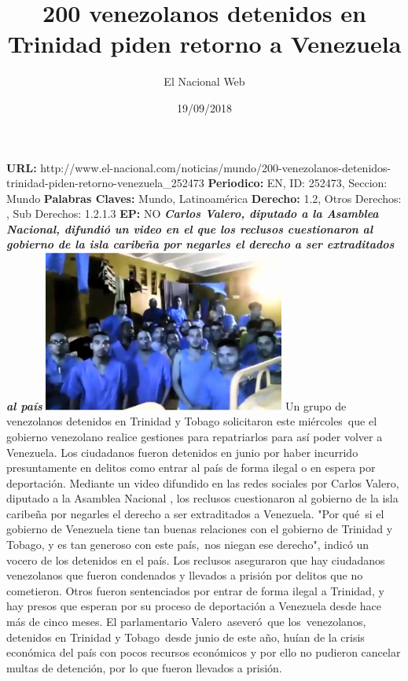 \documentclass{article}%
\title{\textbf{200 venezolanos detenidos en Trinidad piden retorno a Venezuela}}%
\author{El Nacional Web}%
\date{19/09/2018}%
\begin{document}
%
\normalsize%
\maketitle%
\textbf{URL: }%
http://www.el{-}nacional.com/noticias/mundo/200{-}venezolanos{-}detenidos{-}trinidad{-}piden{-}retorno{-}venezuela\_252473\newline%
%
\textbf{Periodico: }%
EN, %
ID: %
252473, %
Seccion: %
Mundo\newline%
%
\textbf{Palabras Claves: }%
Mundo, Latinoamérica\newline%
%
\textbf{Derecho: }%
1.2, %
Otros Derechos: %
, %
Sub Derechos: %
1.2.1.3\newline%
%
\textbf{EP: }%
NO\newline%
\newline%
%
\textbf{\textit{Carlos Valero, diputado a la Asamblea Nacional, difundió un video en el que los reclusos cuestionaron al gobierno de la isla caribeña por negarles el derecho a ser extraditados al país}}%
\newline%
\newline%
%
\includegraphics[width=300px]{188.jpg}%
\newline%
%
Un grupo de venezolanos detenidos en Trinidad y Tobago solicitaron este miércoles~que el gobierno venezolano realice gestiones para repatriarlos para así poder volver a Venezuela.%
\newline%
%
Los ciudadanos fueron detenidos en junio por haber incurrido presuntamente en delitos como entrar al país de forma ilegal o en espera por deportación.%
\newline%
%
Mediante un video difundido en las redes sociales por Carlos Valero, diputado a la Asamblea Nacional , los reclusos cuestionaron al gobierno de la isla caribeña por negarles el derecho a ser extraditados a Venezuela.%
\newline%
%
"Por qué~si el gobierno de Venezuela tiene tan buenas relaciones con el gobierno de Trinidad y Tobago, y es tan generoso con este país,~nos niegan ese derecho", indicó un vocero de los detenidos en el país.%
\newline%
%
Los reclusos aseguraron que hay ciudadanos venezolanos que fueron condenados y llevados a prisión por delitos que no cometieron. Otros fueron sentenciados por entrar de forma ilegal a Trinidad, y hay presos que esperan por su proceso de deportación a Venezuela desde hace más de cinco meses.%
\newline%
%
El parlamentario Valero~aseveró~que los~venezolanos, detenidos en Trinidad y Tobago~desde junio de este año, huían de la crisis económica del país con pocos recursos económicos y por ello no pudieron cancelar multas de detención, por lo que fueron llevados a prisión.%
\newline%
%
\end{document}
